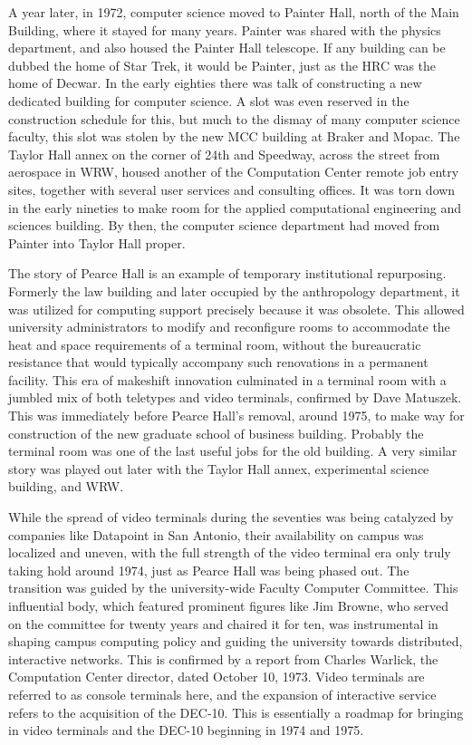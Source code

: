 A year later, in 1972, computer science moved to Painter Hall, north of the Main Building, where it stayed for many years. Painter was shared with the physics department, and also housed the Painter Hall telescope. If any building can be dubbed the home of Star Trek, it would be Painter, just as the HRC was the home of Decwar. In the early eighties there was talk of constructing a new dedicated building for computer science. A slot was even reserved in the construction schedule for this, but much to the dismay of many computer science faculty, this slot was stolen by the new MCC building at Braker and Mopac. The Taylor Hall annex on the corner of 24th and Speedway, across the street from aerospace in WRW, housed another of the Computation Center remote job entry sites, together with several user services and consulting offices. It was torn down in the early nineties to make room for the applied computational engineering and sciences building. By then, the computer science department had moved from Painter into Taylor Hall proper.

The story of Pearce Hall is an example of temporary institutional repurposing. Formerly the law building and later occupied by the anthropology department, it was utilized for computing support precisely because it was obsolete. This allowed university administrators to modify and reconfigure rooms to accommodate the heat and space requirements of a terminal room, without the bureaucratic resistance that would typically accompany such renovations in a permanent facility. This era of makeshift innovation culminated in a terminal room with a jumbled mix of both teletypes and video terminals, confirmed by Dave Matuszek. This was immediately before Pearce Hall’s removal, around 1975, to make way for construction of the new graduate school of business building. Probably the terminal room was one of the last useful jobs for the old building. A very similar story was played out later with the Taylor Hall annex, experimental science building, and WRW.

While the spread of video terminals during the seventies was being catalyzed by companies like Datapoint in San Antonio, their availability on campus was localized and uneven, with the full strength of the video terminal era only truly taking hold around 1974, just as Pearce Hall was being phased out. The transition was guided by the university-wide Faculty Computer Committee. This influential body, which featured prominent figures like Jim Browne, who served on the committee for twenty years and chaired it for ten, was instrumental in shaping campus computing policy and guiding the university towards distributed, interactive networks. This is confirmed by a report from Charles Warlick, the Computation Center director, dated October 10, 1973. Video terminals are referred to as console terminals here, and the expansion of interactive service refers to the acquisition of the DEC-10. This is essentially a roadmap for bringing in video terminals and the DEC-10 beginning in 1974 and 1975. 

